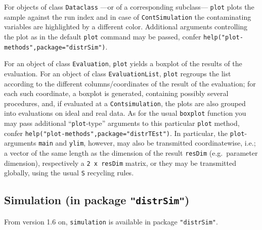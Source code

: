 \documentclass[11pt]{article}
\newcommand{\code}[1]{{\tt #1}}
\newcommand{\pkg}[1]{{\tt "#1"}}
\begin{document}
\par
For objects of  class \code{Dataclass} ---or of a corresponding subclass---
 \code{plot} plots the sample against the run index and in case  of  \code{ContSimulation} the
 contaminating variables are highlighted by a different color. Additional arguments controlling
 the plot as in the default \code{plot} command may be passed, confer \code{help("plot-methods",package="distrSim")}.
 \par
 For an object of class \code{Evaluation},
\code{plot} yields a boxplot of the results of the evaluation.
For an object of class \code{EvaluationList},
\code{plot} regroups the list according to the different columns/coordinates of the result
of the evaluation; for each such coordinate, a boxplot is generated, containing possibly several procedures,
and, if evaluated at a \code{Contsimulation}, the plots are also grouped into evaluations on ideal and
real data. As for the usual \code{boxplot} function you may pass additional ``\code{plot}-type'' arguments
to this particular \code{plot} method, confer \code{help("plot-methods",package="distrTEst")}. In particular, the \code{plot}-arguments \code{main}
and \code{ylim}, however, may also be transmitted coordinatewise,
i.e.; a vector of the same length as the dimension of the result {\tt resDim} (e.g.\ parameter dimension),
respectively a {\tt 2 x resDim} matrix, or they may be transmitted globally, using the usual {\tt S} recycling
rules.

\subsection[Simulation (in package distrSim)]{Simulation (in package \pkg{distrSim})}
%
From version 1.6 on, \code{simulation} is available in package  \pkg{distrSim}.
\end{document}
